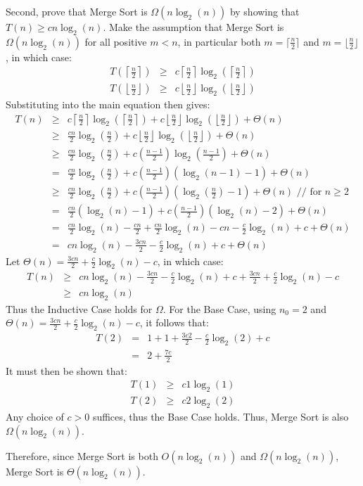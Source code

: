 Second, prove that Merge Sort is $\Omega(n\log_2(n))$ by showing that $T(n) \geq cn\log_2(n)$.  Make the assumption that Merge Sort is $\Omega(n\log_2(n))$ for all positive $m < n$, in particular both $m = \lceil \frac{n}{2} \rceil$ and $m = \lfloor \frac{n}{2} \rfloor$, in which case:
\begin{eqnarray*}
	T\left(\left\lceil \frac{n}{2} \right\rceil\right) &\geq& c\left\lceil\frac{n}{2}\right\rceil \log_2\left(\left\lceil\frac{n}{2}\right\rceil\right) \\
	T\left(\left\lfloor \frac{n}{2} \right\rfloor\right) &\geq& c\left\lfloor\frac{n}{2}\right\rfloor \log_2\left(\left\lfloor\frac{n}{2}\right\rfloor\right)
\end{eqnarray*}
Substituting into the main equation then gives:
\begin{eqnarray*}
	T(n) &\geq& c\left\lceil\frac{n}{2}\right\rceil \log_2\left(\left\lceil\frac{n}{2}\right\rceil\right) + c \left\lfloor\frac{n}{2}\right\rfloor \log_2\left(\left\lfloor\frac{n}{2}\right\rfloor\right) + \Theta(n) \\
	 &\geq& \frac{cn}{2}\log_2\left(\frac{n}{2}\right) + c\left\lfloor\frac{n}{2}\right\rfloor \log_2\left(\left\lfloor\frac{n}{2}\right\rfloor\right) + \Theta(n) \\
	 &\geq& \frac{cn}{2}\log_2\left(\frac{n}{2}\right) + c\left(\frac{n-1}{2}\right)\log_2\left(\frac{n-1}{2}\right) + \Theta(n) \\
	 &=& \frac{cn}{2}\log_2\left(\frac{n}{2}\right) + c\left(\frac{n-1}{2}\right)(\log_2(n-1)-1) + \Theta(n) \\
	 &\geq& \frac{cn}{2}\log_2\left(\frac{n}{2}\right) + c\left(\frac{n-1}{2}\right)\left(\log_2\left(\frac{n}{2}\right)-1\right) + \Theta(n) \text{ // for } n \geq 2 \\
	 &=& \frac{cn}{2}(\log_2(n)-1) + c\left(\frac{n-1}{2}\right)(\log_2(n)-2) + \Theta(n) \\
	 &=& \frac{cn}{2}\log_2(n) - \frac{cn}{2} + \frac{cn}{2}\log_2(n) - cn - \frac{c}{2}\log_2(n) + c + \Theta(n) \\
	 &=& cn\log_2(n) - \frac{3cn}{2} - \frac{c}{2}\log_2(n) + c + \Theta(n)
\end{eqnarray*}
Let $\Theta(n) = \frac{3cn}{2} + \frac{c}{2}\log_2(n) - c$, in which case:
\begin{eqnarray*}
	T(n) &\geq& cn\log_2(n) - \frac{3cn}{2} - \frac{c}{2}\log_2(n) + c + \frac{3cn}{2} + \frac{c}{2}\log_2(n) - c \\
	 &\geq& cn\log_2(n)
\end{eqnarray*}
Thus the Inductive Case holds for $\Omega$.  For the Base Case, using $n_0 = 2$ and $\Theta(n) = \frac{3cn}{2} + \frac{c}{2}\log_2(n) - c$, it follows that:
\begin{eqnarray*}
	T(2) &=& 1 + 1 + \frac{3c2}{2} - \frac{c}{2}\log_2(2) + c \\
	 &=& 2 + \frac{7c}{2}
\end{eqnarray*}
It must then be shown that:
\begin{eqnarray*}
	T(1) &\geq& c1\log_2(1) \\
	T(2) &\geq& c2\log_2(2)
\end{eqnarray*}
Any choice of $c > 0$ suffices, thus the Base Case holds.  Thus, Merge Sort is also $\Omega(n\log_2(n))$.

Therefore, since Merge Sort is both $O(n\log_2(n))$ and $\Omega(n\log_2(n))$, Merge Sort is $\Theta(n\log_2(n))$.
